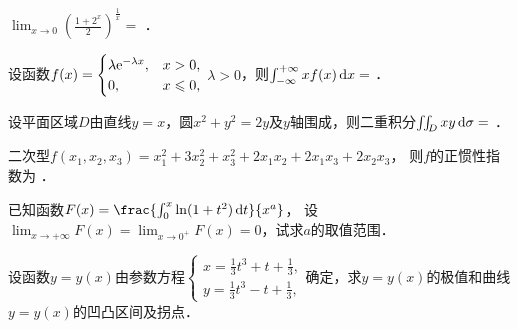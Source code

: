 \documentclass[plain,noanswer,medmath]{../../template/jnuexam}
\begin{document}










\begin{problem}
$\lim_{x \to 0} \left(\frac{1 + 2^x}{2} \right)^{\frac{1}{x}} =$ \fillin{}．
\end{problem}






\begin{problem}
设函数$f(x) = \begin{cases}
  \lambda \mathrm{e}^{- \lambda x}, & x > 0, \\
                         0, & x \leqslant 0,
\end{cases}$ $\lambda > 0$，则$\int_{-\infty}^{+\infty} xf(x)\mathop{}\!\mathrm{d} x =$ \fillin{}．
\end{problem}


\begin{problem}
设平面区域$D$由直线$y = x$，圆$x^2 + y^2 = 2y$及$y$轴围成，则二重积分$\iint_D xy\d\sigma =$ \fillin{}．
\end{problem}


\begin{problem}
二次型$f(x_1,x_2,x_3) = x_{1}^{2} + 3x_2^2 + x_3^2 + 2x_1x_2 + 2x_1x_3 + 2x_2x_3$，
则$f$的正惯性指数为 \fillin{}．
\end{problem}




\begin{problem}[points=10]
已知函数$F(x) = \frac{\int_0^x \ln(1 + t^2)\dt}{x^a}$，
设$\!\!\lim_{x \to +\infty}\!\!\! F(x) = \!\lim_{x \to 0^+}\! F(x) = 0$，试求$a$的取值范围．
\end{problem}


\begin{problem}[points=11]
设函数$y = y(x)$由参数方程$\begin{cases}
  x = \frac{1}{3}t^3 + t + \frac{1}{3}, \\
  y = \frac{1}{3}t^3 - t + \frac{1}{3},
\end{cases}$确定，求$y = y(x)$的极值和曲线$y = y(x)$的凹凸区间及拐点．
\end{problem}
\end{document}
